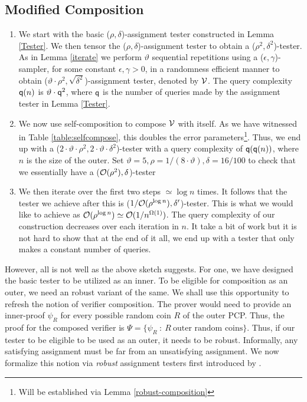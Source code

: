 \subsection*{Modified Composition}\label{modified}
\begin{enumerate}
\item We start with the basic ($\rho,\delta$)-assignment tester constructed in Lemma
  \ref{Tester}. We then tensor the ($\rho,\delta$)-assignment tester to obtain a
  ($\rho^2,\delta^2$)-tester. As in Lemma \ref{iterate} we perform $\vartheta$
  sequential repetitions using a ($\epsilon, \gamma$)-sampler, for
  some constant $\epsilon, \gamma > 0$, in a randomness efficient manner
  to obtain ($\vartheta \cdot \rho^2, \sqrt{ \delta^2 }$)-assignment tester, denoted
  by ${\cal V}$. The query complexity ${\sf q}(n)$ is $\vartheta \cdot {\sf q}^2$,
  where ${\sf q}$ is the number of queries made by the assignment tester in Lemma
  \ref{Tester}.

\item We now use self-composition to compose ${\cal V}$ with
  itself. As we have witnessed in Table \ref{table:selfcompose}, this 
 doubles the error parameters\footnote{Will be established 
	  via Lemma \ref{robust-composition}}. Thus, we end up with a ($ 2
  \cdot \vartheta \cdot \rho^2, 2 \cdot
  \vartheta \cdot \delta^2$)-tester with a
  query complexity of ${\sf q}({\sf q}(n))$, where $n$ is the size of the outer.
  Set $\vartheta = 5 , \rho = 1/( 8
  \cdot \vartheta), \delta = 16/100$ to check that we essentially have a (${\cal O}(\rho^2), \delta$)-tester
  
\item We then iterate over the first two steps $ \simeq \log n$ times.  It
  follows that the tester we achieve after this is ($ 1/{\cal
    O}(\rho^{\log n}), \delta'$)-tester. This is what we would like to achieve
  as ${\cal O}(\rho^{\log n}) \simeq {\cal O}(1/n^{\Omega(1)})$. The
  query complexity of our construction decreases over each iteration
  in $n$. It take a bit of work but it is not hard to show that at the 
  end of it all, we end up with a tester that only makes a
  constant number of queries.
\end{enumerate}

However, all is not well as the above sketch suggests. For one, we
have designed the basic tester to be utilized as an inner. To be
eligible for composition as an outer, we need an robust variant of the
same. We shall use this opportunity to refresh the notion of verifier
composition. The prover would need to provide an inner-proof
$\psi_{R}$ for every possible random coin $R$ of the outer PCP. Thus,
the proof for the composed verifier is $\Psi = \big\{ \psi_{R}\ :\ R \
\mbox{outer random coins} \big\}$. Thus, if our tester to be eligible
to be used as an outer, it needs to be robust. Informally, any
satisfying assignment must be far from an unsatisfying assignment.  We
now formalize this notion via {\em robust} assignment testers first
introduced by \cite{DR,BGHSV}.

